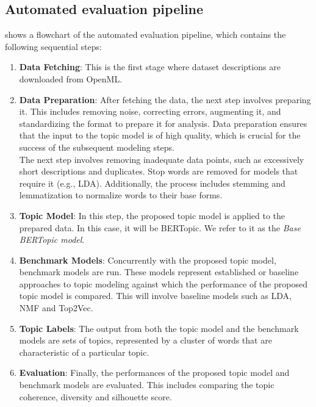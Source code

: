 \subsection{Automated evaluation pipeline}

 shows a flowchart of the automated evaluation pipeline, which contains the following sequential steps:

\begin{enumerate}

    \item \textbf{Data Fetching}: This is the first stage where dataset descriptions are downloaded from OpenML.

    \item \textbf{Data Preparation}: After fetching the data, the next step involves preparing it. This includes removing noise, correcting errors, augmenting it, and standardizing the format to prepare it for analysis. Data preparation ensures that the input to the topic model is of high quality, which is crucial for the success of the subsequent modeling steps. \\ The next step involves removing inadequate data points, such as excessively short descriptions and duplicates. Stop words are removed for models that require it (e.g., LDA). Additionally, the process includes stemming and lemmatization to normalize words to their base forms.

    \item \textbf{Topic Model}: In this step, the proposed topic model is applied to the prepared data. In this case, it will be BERTopic. We refer to it as the \textit{Base BERTopic model}.

    \item \textbf{Benchmark Models}: Concurrently with the proposed topic model, benchmark models are run. These models represent established or baseline approaches to topic modeling against which the performance of the proposed topic model is compared. This will involve baseline models such as LDA, NMF and Top2Vec.

    \item \textbf{Topic Labels}: The output from both the topic model and the benchmark models are sets of topics, represented by a cluster of words that are characteristic of a particular topic.

    \item \textbf{Evaluation}: Finally, the performances of the proposed topic model and benchmark models are evaluated. This includes comparing the topic coherence, diversity and silhouette score.

\end{enumerate}

